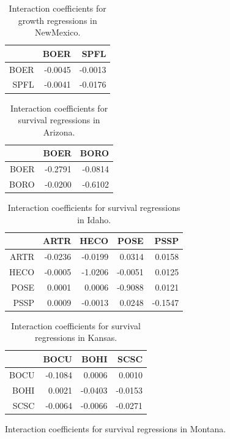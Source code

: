 \documentclass[12pt,]{article}
\begin{document}
\begin{table}[ht]
\end{table}\begin{table}[ht]
\centering
\caption{Interaction coefficients for growth regressions in NewMexico.} 
\begin{tabular}{rrr}
  \hline
 & BOER & SPFL \\ 
  \hline
BOER & -0.0045 & -0.0013 \\ 
  SPFL & -0.0041 & -0.0176 \\ 
   \hline
\end{tabular}
\end{table}\begin{table}[ht]
\centering
\caption{Interaction coefficients for survival regressions in Arizona.} 
\begin{tabular}{rrr}
  \hline
 & BOER & BORO \\ 
  \hline
BOER & -0.2791 & -0.0814 \\ 
  BORO & -0.0200 & -0.6102 \\ 
   \hline
\end{tabular}
\end{table}\begin{table}[ht]
\centering
\caption{Interaction coefficients for survival regressions in Idaho.} 
\begin{tabular}{rrrrr}
  \hline
 & ARTR & HECO & POSE & PSSP \\ 
  \hline
ARTR & -0.0236 & -0.0199 & 0.0314 & 0.0158 \\ 
  HECO & -0.0005 & -1.0206 & -0.0051 & 0.0125 \\ 
  POSE & 0.0001 & 0.0006 & -0.9088 & 0.0121 \\ 
  PSSP & 0.0009 & -0.0013 & 0.0248 & -0.1547 \\ 
   \hline
\end{tabular}
\end{table}\begin{table}[ht]
\centering
\caption{Interaction coefficients for survival regressions in Kansas.} 
\begin{tabular}{rrrr}
  \hline
 & BOCU & BOHI & SCSC \\ 
  \hline
BOCU & -0.1084 & 0.0006 & 0.0010 \\ 
  BOHI & 0.0021 & -0.0403 & -0.0153 \\ 
  SCSC & -0.0064 & -0.0066 & -0.0271 \\ 
   \hline
\end{tabular}
\end{table}\begin{table}[ht]
\centering
\caption{Interaction coefficients for survival regressions in Montana.} 

\end{table}
\end{document}
